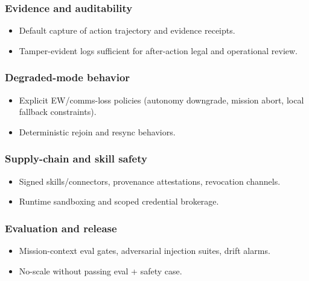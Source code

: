 \documentclass[
]{article}
\providecommand{\tightlist}{%
  \setlength{\itemsep}{0pt}\setlength{\parskip}{0pt}}
\begin{document}
\hypertarget{evidence-and-auditability}{%
\subsubsection{Evidence and
auditability}\label{evidence-and-auditability}}

\begin{itemize}
\tightlist
\item
  Default capture of action trajectory and evidence receipts.
\item
  Tamper-evident logs sufficient for after-action legal and operational
  review.
\end{itemize}

\hypertarget{degraded-mode-behavior}{%
\subsubsection{Degraded-mode behavior}\label{degraded-mode-behavior}}

\begin{itemize}
\tightlist
\item
  Explicit EW/comms-loss policies (autonomy downgrade, mission abort,
  local fallback constraints).
\item
  Deterministic rejoin and resync behaviors.
\end{itemize}

\hypertarget{supply-chain-and-skill-safety}{%
\subsubsection{Supply-chain and skill
safety}\label{supply-chain-and-skill-safety}}

\begin{itemize}
\tightlist
\item
  Signed skills/connectors, provenance attestations, revocation
  channels.
\item
  Runtime sandboxing and scoped credential brokerage.
\end{itemize}

\hypertarget{evaluation-and-release}{%
\subsubsection{Evaluation and release}\label{evaluation-and-release}}

\begin{itemize}
\tightlist
\item
  Mission-context eval gates, adversarial injection suites, drift
  alarms.
\item
  No-scale without passing eval + safety case.
\end{itemize}
\end{document}
